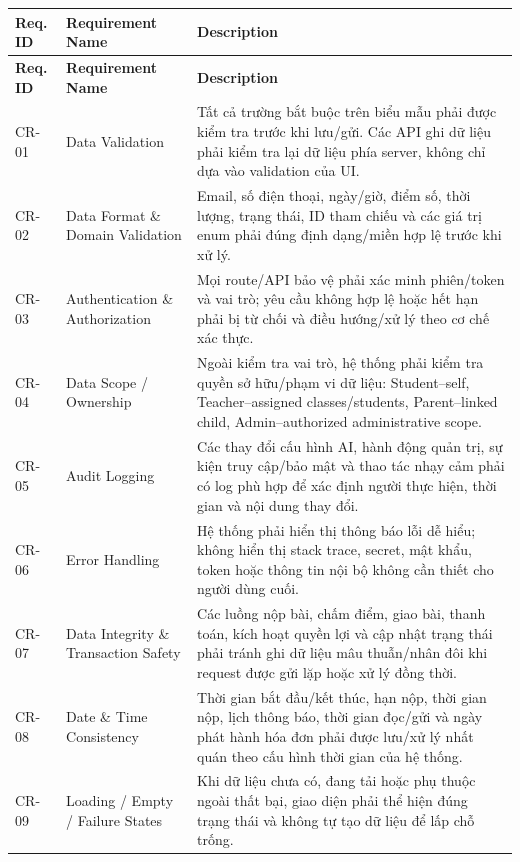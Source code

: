 \documentclass[12pt,a4paper,oneside]{report}
\begin{document}
\begin{longtable}{|p{1.6cm}|p{3.2cm}|p{9.2cm}|}
\hline
\rowcolor{orange!15}
\textbf{Req. ID} & \textbf{Requirement Name} & \textbf{Description} \\
\hline
\endfirsthead
\hline
\rowcolor{orange!15}
\textbf{Req. ID} & \textbf{Requirement Name} & \textbf{Description} \\
\hline
\endhead
CR-01 & Data Validation & Tất cả trường bắt buộc trên biểu mẫu phải được kiểm tra trước khi lưu/gửi. Các API ghi dữ liệu phải kiểm tra lại dữ liệu phía server, không chỉ dựa vào validation của UI. \\ \hline
CR-02 & Data Format \& Domain Validation & Email, số điện thoại, ngày/giờ, điểm số, thời lượng, trạng thái, ID tham chiếu và các giá trị enum phải đúng định dạng/miền hợp lệ trước khi xử lý. \\ \hline
CR-03 & Authentication \& Authorization & Mọi route/API bảo vệ phải xác minh phiên/token và vai trò; yêu cầu không hợp lệ hoặc hết hạn phải bị từ chối và điều hướng/xử lý theo cơ chế xác thực. \\ \hline
CR-04 & Data Scope / Ownership & Ngoài kiểm tra vai trò, hệ thống phải kiểm tra quyền sở hữu/phạm vi dữ liệu: Student--self, Teacher--assigned classes/students, Parent--linked child, Admin--authorized administrative scope. \\ \hline
CR-05 & Audit Logging & Các thay đổi cấu hình AI, hành động quản trị, sự kiện truy cập/bảo mật và thao tác nhạy cảm phải có log phù hợp để xác định người thực hiện, thời gian và nội dung thay đổi. \\ \hline
CR-06 & Error Handling & Hệ thống phải hiển thị thông báo lỗi dễ hiểu; không hiển thị stack trace, secret, mật khẩu, token hoặc thông tin nội bộ không cần thiết cho người dùng cuối. \\ \hline
CR-07 & Data Integrity \& Transaction Safety & Các luồng nộp bài, chấm điểm, giao bài, thanh toán, kích hoạt quyền lợi và cập nhật trạng thái phải tránh ghi dữ liệu mâu thuẫn/nhân đôi khi request được gửi lặp hoặc xử lý đồng thời. \\ \hline
CR-08 & Date \& Time Consistency & Thời gian bắt đầu/kết thúc, hạn nộp, thời gian nộp, lịch thông báo, thời gian đọc/gửi và ngày phát hành hóa đơn phải được lưu/xử lý nhất quán theo cấu hình thời gian của hệ thống. \\ \hline
CR-09 & Loading / Empty / Failure States & Khi dữ liệu chưa có, đang tải hoặc phụ thuộc ngoài thất bại, giao diện phải thể hiện đúng trạng thái và không tự tạo dữ liệu để lấp chỗ trống. \\ \hline

\end{longtable}
\end{document}
